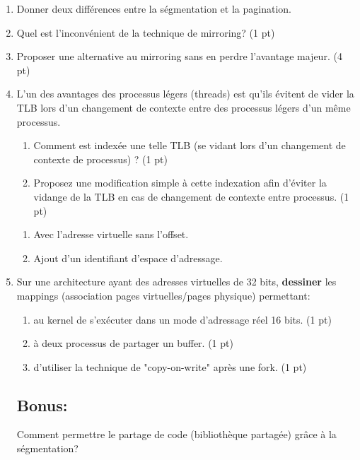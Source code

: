 \begin{enumerate}

\item Donner deux différences entre la ségmentation et la pagination.

\item Quel est l'inconvénient de la technique de mirroring? (1 pt)

\item Proposer une alternative au mirroring sans en perdre l'avantage majeur. (4 pt)

\item L'un des avantages des processus légers (threads) est qu'ils évitent de vider la TLB lors d'un changement de contexte entre des processus légers d'un même processus.
\begin{enumerate}
  \item Comment est indexée une telle TLB (se vidant lors d'un changement de contexte de processus) ? (1 pt)
  \item Proposez une modification simple à cette indexation afin d'éviter la vidange de la TLB en cas de changement de contexte entre processus. (1 pt)
\end{enumerate}

\begin{correction}
\begin{enumerate}[label=(\alph*)]
\item Avec l'adresse virtuelle sans l'offset.
\item Ajout d'un identifiant d'espace d'adressage.
\end{enumerate}
\end{correction}

\item Sur une architecture ayant des adresses virtuelles de 32 bits, \textbf{dessiner} les mappings (association pages virtuelles/pages physique) permettant:
\begin{enumerate}[label=(\alph*)]
\item au kernel de s'exécuter dans un mode d'adressage réel 16 bits. (1 pt)
\item à deux processus de partager un buffer. (1 pt)
\item d'utiliser la technique de "copy-on-write" après une fork. (1 pt)
\end{enumerate}

\subsection*{Bonus:}
Comment permettre le partage de code (bibliothèque partagée) grâce à la ségmentation?

\end{enumerate}


